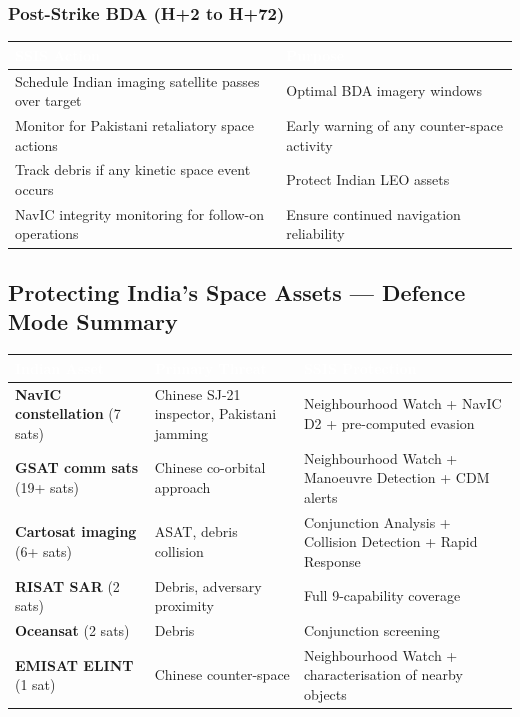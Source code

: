 \documentclass[11pt,a4paper]{article}
\newcommand{\TH}[1]{\textcolor{white}{\textbf{#1}}}
\begin{document}
\subsubsection{Post-Strike BDA (H+2 to H+72)}
\begin{table}[H]\centering\small
\begin{tabularx}{\textwidth}{|p{6cm}|X|}
\hline
\rowcolor{dblue}\TH{SSIS Action} & \TH{Purpose} \\
\hline
Schedule Indian imaging satellite passes over target & Optimal BDA imagery windows \\
\hline
Monitor for Pakistani retaliatory space actions & Early warning of any counter-space activity \\
\hline
Track debris if any kinetic space event occurs & Protect Indian LEO assets \\
\hline
NavIC integrity monitoring for follow-on operations & Ensure continued navigation reliability \\
\hline
\end{tabularx}
\end{table}

\subsection{Protecting India's Space Assets --- Defence Mode Summary}
\begin{table}[H]\centering\small
\begin{tabularx}{\textwidth}{|p{3.5cm}|p{4cm}|X|}
\hline
\rowcolor{dblue}\TH{Indian Asset} & \TH{Primary Threat} & \TH{SSIS Protection} \\
\hline
\textbf{NavIC constellation} (7 sats) & Chinese SJ-21 inspector, Pakistani jamming & Neighbourhood Watch + NavIC D2 + pre-computed evasion \\
\hline
\textbf{GSAT comm sats} (19+ sats) & Chinese co-orbital approach & Neighbourhood Watch + Manoeuvre Detection + CDM alerts \\
\hline
\textbf{Cartosat imaging} (6+ sats) & ASAT, debris collision & Conjunction Analysis + Collision Detection + Rapid Response \\
\hline
\textbf{RISAT SAR} (2 sats) & Debris, adversary proximity & Full 9-capability coverage \\
\hline
\textbf{Oceansat} (2 sats) & Debris & Conjunction screening \\
\hline
\textbf{EMISAT ELINT} (1 sat) & Chinese counter-space & Neighbourhood Watch + characterisation of nearby objects \\
\hline
\end{tabularx}
\end{table}
\end{document}
